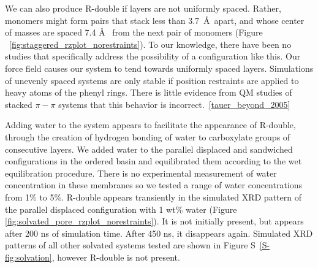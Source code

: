 \documentclass[journal=jpcbfk,manuscript=article]{achemso}
\begin{document}
  We can also produce R-double if layers are not uniformly spaced. Rather,
  monomers might form pairs that stack less than 3.7~\AA~apart, and whose center
  of masses are spaced 7.4 \AA~ from the next pair of monomers (Figure
  ~\ref{fig:staggered_rzplot_norestraints}). To our knowledge, there have been no
  studies that specifically address the possibility of a configuration like this.
  Our force field causes our system to tend towards uniformly spaced layers.
  Simulations of unevenly spaced systems are only stable if position restraints
  are applied to heavy atoms of the phenyl rings.  There is little evidence from
  QM studies of stacked $\pi-\pi$ systems that this behavior is
  incorrect.~\ref{tauer_beyond_2005} 
  
  Adding water to the system appears to facilitate the appearance of R-double,
  through the creation of hydrogen bonding of water to carboxylate groups of
  consecutive layers. We added water to the parallel displaced and sandwiched
  configurations in the ordered basin and equilibrated them according to the wet
  equilibration procedure. There is no experimental measurement of water
  concentration in these membranes so we tested a range of water concentrations
  from 1\% to 5\%. R-double appears transiently in the simulated XRD pattern of
  the parallel displaced configuration with 1 wt\% water (Figure
  \ref{fig:solvated_pore_rzplot_norestraints}). It is not initially present, but
  appears after 200 ns of simulation time. After 450 ns, it disappears again.
  Simulated XRD patterns of all other solvated systems tested are shown in Figure
  S~\ref{S-fig:solvation}, however R-double is not present.
\end{document}
